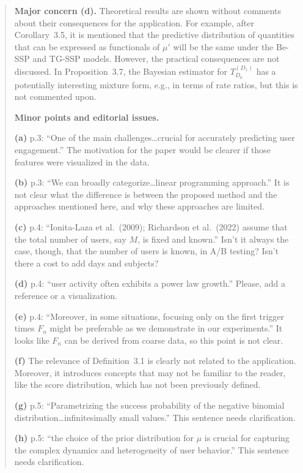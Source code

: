 \begin{quote}
\medskip
\textbf{Major concern (d).}
Theoretical results are shown without comments about their
consequences for the application. For example, after Corollary~3.5,
it is mentioned that the predictive distribution of quantities that
can be expressed as functionals of $\mu'$ will be the same under the
Be-SSP and TG-SSP models. However, the practical consequences are not
discussed. In Proposition~3.7, the Bayesian estimator for
$T_{D_0}^{(D_1)}$ has a potentially interesting mixture form, e.g.,
in terms of rate ratios, but this is not commented upon.

\medskip
\textbf{Minor points and editorial issues.}

\medskip
\textbf{(a)} p.3: ``One of the main challenges\ldots crucial for
accurately predicting user engagement.'' The motivation for the paper
would be clearer if those features were visualized in the data.

\textbf{(b)} p.3: ``We can broadly categorize\ldots linear
programming approach.'' It is not clear what the difference is between
the proposed method and the approaches mentioned here, and why these
approaches are limited.

\textbf{(c)} p.4: ``Ionita-Laza et al.\ (2009); Richardson et al.\
(2022) assume that the total number of users, say $M$, is fixed and
known.'' Isn't it always the case, though, that the number of users
is known, in A/B testing? Isn't there a cost to add days and subjects?

\textbf{(d)} p.4: ``user activity often exhibits a power law growth.''
Please, add a reference or a visualization.

\textbf{(e)} p.4: ``Moreover, in some situations, focusing only on
the first trigger times $F_n$ might be preferable as we demonstrate
in our experiments.'' It looks like $F_n$ can be derived from coarse
data, so this point is not clear.

\textbf{(f)} The relevance of Definition~3.1 is clearly not related
to the application. Moreover, it introduces concepts that may not be
familiar to the reader, like the score distribution, which has not
been previously defined.

\textbf{(g)} p.5: ``Parametrizing the success probability of the
negative binomial distribution\ldots infinitesimally small values.''
This sentence needs clarification.

\textbf{(h)} p.5: ``the choice of the prior distribution for $\mu$
is crucial for capturing the complex dynamics and heterogeneity of
user behavior.'' This sentence needs clarification.


\end{quote}
